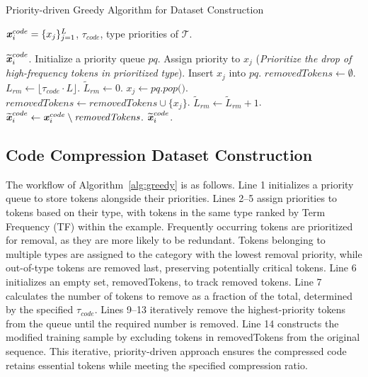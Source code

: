 
\newcommand{\INPUT}{\item[\textbf{Input:}]}
\newcommand{\OUTPUT}{\item[\textbf{Output:}]}
\begin{algorithm}
\caption{\footnotesize Priority-driven Greedy Algorithm for Dataset Construction} 
\label{alg:greedy}
\begin{algorithmic}[1]
\footnotesize
\INPUT $\textbf{\textit{x}}_i^{code} = \{x_j\}_{j=1}^{L}$, $\tau_{code}$, type priorities of $\mathcal{T}$.
\OUTPUT $\widetilde{\textbf{\textit{x}}}_i^{code}$.
\STATE Initialize a priority queue $\textit{pq}$.
    \STATE Assign priority to $x_j$ (\textit{Prioritize the drop of high-frequency tokens in prioritized type}).
    \STATE Insert $x_j$ into $\textit{pq}$.
\ENDFOR
\STATE $\textit{removedTokens} \gets \emptyset$.
\STATE $L_{rm} \gets \lfloor \tau_{code} \cdot L \rfloor$.
\STATE $\widetilde{L}_{rm} \gets 0$.
    \STATE $x_j \gets \textit{pq.pop()}$.
    \STATE $\textit{removedTokens} \gets \textit{removedTokens} \cup \{x_j\}$.
    \STATE $\widetilde{L}_{rm} \gets \widetilde{L}_{rm} + 1$.
\ENDWHILE
\STATE $\widetilde{\textbf{\textit{x}}}_i^{code} \gets \textbf{\textit{x}}_i^{code} \setminus \textit{removedTokens}$.
\RETURN $\widetilde{\textbf{\textit{x}}}_i^{code}$.
\end{algorithmic}
\end{algorithm}

\subsection{Code Compression Dataset Construction}\label{sec:trainingset}
The workflow of Algorithm~\ref{alg:greedy} is as follows. Line 1 initializes a priority queue to store tokens alongside their priorities. Lines 2–5 assign priorities to tokens based on their type, with tokens in the same type ranked by Term Frequency (TF) within the example. Frequently occurring tokens are prioritized for removal, as they are more likely to be redundant. Tokens belonging to multiple types are assigned to the category with the lowest removal priority, while out-of-type tokens are removed last, preserving potentially critical tokens. Line 6 initializes an empty set, removedTokens, to track removed tokens. Line 7 calculates the number of tokens to remove as a fraction of the total, determined by the specified $\tau_{code}$. Lines 9–13 iteratively remove the highest-priority tokens from the queue until the required number is removed. Line 14 constructs the modified training sample by excluding tokens in removedTokens from the original sequence. This iterative, priority-driven approach ensures the compressed code retains essential tokens while meeting the specified compression ratio.

